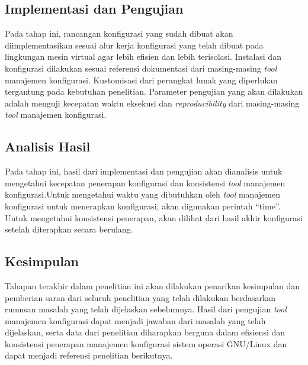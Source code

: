 \documentclass[10pt,twoside]{report}
\begin{document}
\begin{adjustwidth}{20pt}{}
	\subsection{Implementasi dan Pengujian}
	\vspace{-3mm}
	\begin{adjustwidth}{20pt}{}
		Pada tahap ini, rancangan konfigurasi yang sudah dibuat akan
		diimplementasikan sesuai alur kerja konfigurasi yang telah dibuat pada
		lingkungan mesin virtual agar lebih efisien dan lebih terisolasi. Instalasi
		dan konfigurasi dilakukan sesuai referensi dokumentasi dari masing-masing
		\textit{tool} manajemen konfigurasi. Kustomisasi dari perangkat lunak yang
		diperlukan tergantung pada kebutuhan penelitian. Parameter pengujian yang
		akan dilakukan adalah menguji kecepatan waktu eksekusi dan \textit{reproducibility} dari
		masing-masing \textit{tool} manajemen konfigurasi.
	\end{adjustwidth}
\end{adjustwidth}
\begin{adjustwidth}{20pt}{}
	\subsection{Analisis Hasil}
	\vspace{-3mm}
	\begin{adjustwidth}{20pt}{}
		Pada tahap ini, hasil dari implementasi dan pengujian akan dianalisis untuk
		mengetahui kecepatan penerapan konfigurasi dan konsistensi \textit{tool} manajemen
		konfigurasi.Untuk mengetahui waktu yang dibutuhkan oleh \textit{tool} manajemen
		konfigurasi untuk menerapkan konfigurasi, akan digunakan perintah “time”.
		Untuk mengetahui konsistensi penerapan, akan dilihat dari hasil akhir konfigurasi
		setelah diterapkan secara berulang.
	\end{adjustwidth}
\end{adjustwidth}

\begin{adjustwidth}{20pt}{}
	\subsection{Kesimpulan}
	\vspace{-3mm}
	\begin{adjustwidth}{20pt}{}
		Tahapan terakhir dalam penelitian ini akan dilakukan penarikan kesimpulan
		dan pemberian saran dari seluruh penelitian yang telah dilakukan
		berdasarkan rumusan masalah yang telah dijelaskan sebelumnya. Hasil dari
		pengujian \textit{tool} manajemen konfigurasi dapat menjadi jawaban dari masalah
		yang telah dijelaskan, serta data dari penelitian diharapkan berguna dalam
		efisiensi dan konsistensi penerapan manajemen konfigurasi sistem operasi
		GNU/Linux dan dapat menjadi referensi penelitian berikutnya.
	\end{adjustwidth}
\end{adjustwidth}
\vspace{3mm}
\end{document}
